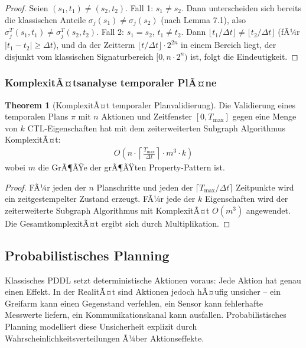 ﻿\documentclass[a4paper,12pt]{article}
\theoremstyle{definition}
\newtheorem{theorem}{Theorem}[section]
\begin{document}
\begin{proof}
Seien $(s_1, t_1) \neq (s_2, t_2)$. Fall 1: $s_1 \neq s_2$. Dann unterscheiden sich bereits die klassischen Anteile $\sigma_j(s_1) \neq \sigma_j(s_2)$ (nach Lemma 7.1), also $\sigma_j^T(s_1, t_1) \neq \sigma_j^T(s_2, t_2)$. Fall 2: $s_1 = s_2$, $t_1 \neq t_2$. Dann $\lfloor t_1/\Delta t\rfloor \neq \lfloor t_2/\Delta t\rfloor$ (fÃ¼r $|t_1 - t_2| \geq \Delta t$), und da der Zeitterm $\lfloor t/\Delta t\rfloor \cdot 2^{2n}$ in einem Bereich liegt, der disjunkt vom klassischen Signaturbereich $[0, n \cdot 2^n)$ ist, folgt die Eindeutigkeit.
\end{proof}

\subsubsection{KomplexitÃ¤tsanalyse temporaler PlÃ¤ne}

\begin{theorem}[KomplexitÃ¤t temporaler Planvalidierung]
Die Validierung eines temporalen Plans $\pi$ mit $n$ Aktionen und Zeitfenster $[0, T_{\max}]$ gegen eine Menge von $k$ CTL-Eigenschaften hat mit dem zeiterweiterten Subgraph Algorithmus KomplexitÃ¤t:
\begin{align}
  O\!\left(n \cdot \left\lceil \frac{T_{\max}}{\Delta t} \right\rceil \cdot m^3 \cdot k\right)
\end{align}
wobei $m$ die GrÃ¶ÃŸe der grÃ¶ÃŸten Property-Pattern ist.
\end{theorem}

\begin{proof}
FÃ¼r jeden der $n$ Planschritte und jeden der $\lceil T_{\max}/\Delta t \rceil$ Zeitpunkte wird ein zeitgestempelter Zustand erzeugt. FÃ¼r jede der $k$ Eigenschaften wird der zeiterweiterte Subgraph Algorithmus mit KomplexitÃ¤t $O(m^3)$ angewendet. Die GesamtkomplexitÃ¤t ergibt sich durch Multiplikation.
\end{proof}

\subsection{Probabilistisches Planning}

Klassisches PDDL setzt deterministische Aktionen voraus: Jede Aktion hat genau einen Effekt. In der RealitÃ¤t sind Aktionen jedoch hÃ¤ufig unsicher -- ein Greifarm kann einen Gegenstand verfehlen, ein Sensor kann fehlerhafte Messwerte liefern, ein Kommunikationskanal kann ausfallen. Probabilistisches Planning modelliert diese Unsicherheit explizit durch Wahrscheinlichkeitsverteilungen Ã¼ber Aktionseffekte.
\end{document}
